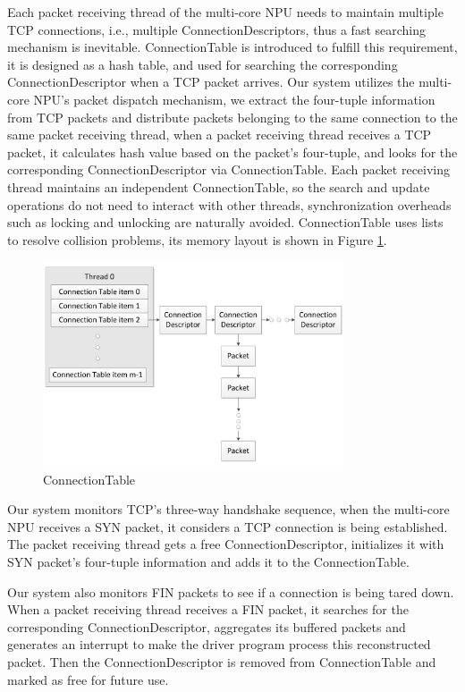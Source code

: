 \documentclass[conference]{IEEEtran}
\begin{document}
Each packet receiving thread of the multi-core NPU needs to maintain multiple TCP connections, i.e., multiple ConnectionDescriptors, thus a fast searching mechanism is inevitable. ConnectionTable is introduced to fulfill this requirement, it is designed as a hash table, and used for searching the corresponding ConnectionDescriptor when a TCP packet arrives. Our system utilizes the multi-core NPU's packet dispatch mechanism, we extract the four-tuple information from TCP packets and distribute packets belonging to the same connection to the same packet receiving thread, when a packet receiving thread receives a TCP packet, it calculates hash value based on the packet's four-tuple, and looks for the corresponding ConnectionDescriptor via ConnectionTable. Each packet receiving thread maintains an independent ConnectionTable, so the search and update operations do not need to interact with other threads, synchronization overheads such as locking and unlocking are naturally avoided. ConnectionTable uses lists to resolve collision problems, its memory layout is shown in Figure \ref{connection table}.
\begin{figure}[!t]
\centering
\includegraphics[width=3.5in]{connection_table}
\caption{ConnectionTable}
\label{connection table}
\end{figure}

Our system monitors TCP's three-way handshake sequence, when the multi-core NPU receives a SYN packet, it considers a TCP connection is being established. The packet receiving thread gets a free ConnectionDescriptor, initializes it with SYN packet's four-tuple information and adds it to the ConnectionTable.

Our system also monitors FIN packets to see if a connection is being tared down. When a packet receiving thread receives a FIN packet, it searches for the corresponding ConnectionDescriptor, aggregates its buffered packets and generates an interrupt to make the driver program process this reconstructed packet. Then the ConnectionDescriptor is removed from ConnectionTable and marked as free for future use.
\end{document}
